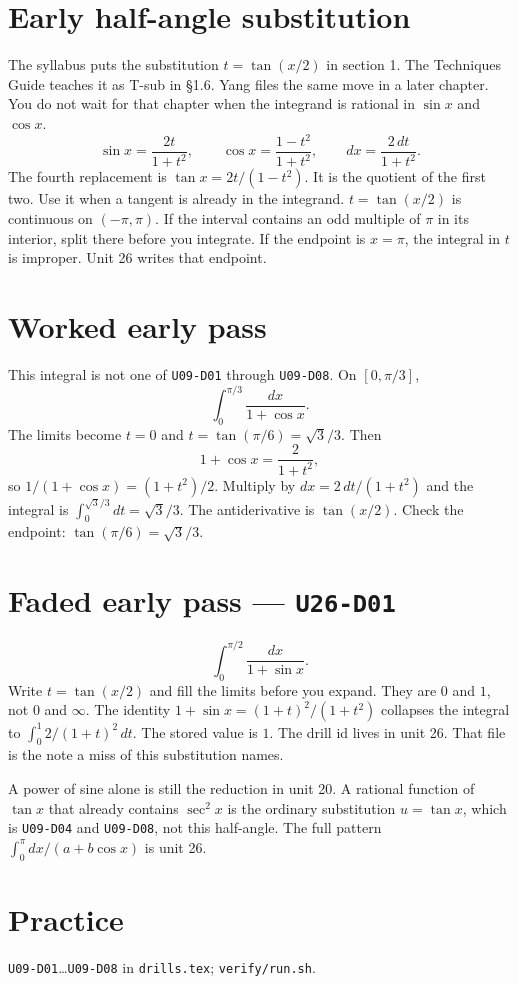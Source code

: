 \section{Early half-angle substitution}
The syllabus puts the substitution $t=\tan(x/2)$ in section 1. The Techniques Guide teaches it as T-sub in \S1.6. Yang files the same move in a later chapter. You do not wait for that chapter when the integrand is rational in $\sin x$ and $\cos x$.
\[
\sin x=\frac{2t}{1+t^2},\qquad
\cos x=\frac{1-t^2}{1+t^2},\qquad
dx=\frac{2\,dt}{1+t^2}.
\]
The fourth replacement is $\tan x=2t/(1-t^2)$. It is the quotient of the first two. Use it when a tangent is already in the integrand. $t=\tan(x/2)$ is continuous on $(-\pi,\pi)$. If the interval contains an odd multiple of $\pi$ in its interior, split there before you integrate. If the endpoint is $x=\pi$, the integral in $t$ is improper. Unit 26 writes that endpoint.

\section{Worked early pass}
This integral is not one of \texttt{U09-D01} through \texttt{U09-D08}. On $[0,\pi/3]$,
\[
\int_0^{\pi/3}\frac{dx}{1+\cos x}.
\]
The limits become $t=0$ and $t=\tan(\pi/6)=\sqrt{3}/3$. Then
\[
1+\cos x=\frac{2}{1+t^2},
\]
so $1/(1+\cos x)=(1+t^2)/2$. Multiply by $dx=2\,dt/(1+t^2)$ and the integral is $\int_0^{\sqrt{3}/3} dt=\sqrt{3}/3$.
The antiderivative is $\tan(x/2)$. Check the endpoint: $\tan(\pi/6)=\sqrt{3}/3$.

\section{Faded early pass --- \texttt{U26-D01}}
\[
\int_0^{\pi/2}\frac{dx}{1+\sin x}.
\]
Write $t=\tan(x/2)$ and fill the limits before you expand. They are $0$ and $1$, not $0$ and $\infty$. The identity $1+\sin x=(1+t)^2/(1+t^2)$ collapses the integral to $\int_0^1 2/(1+t)^2\,dt$. The stored value is $1$. The drill id lives in unit 26. That file is the note a miss of this substitution names.

A power of sine alone is still the reduction in unit 20. A rational function of $\tan x$ that already contains $\sec^2 x$ is the ordinary substitution $u=\tan x$, which is \texttt{U09-D04} and \texttt{U09-D08}, not this half-angle. The full pattern $\int_0^\pi dx/(a+b\cos x)$ is unit 26.

\section{Practice}
\texttt{U09-D01}\ldots\texttt{U09-D08} in \texttt{drills.tex}; \texttt{verify/run.sh}.

